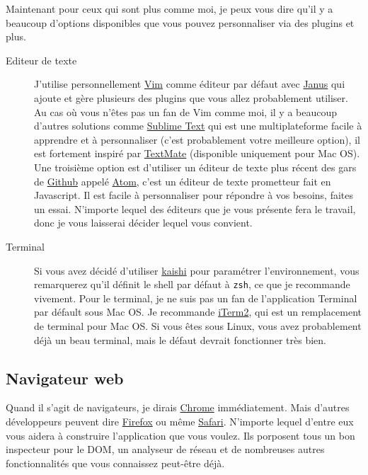 \documentclass[]{report}
\begin{document}
      Maintenant pour ceux qui sont plus comme moi, je peux vous dire qu'il y a beaucoup d'options disponibles que vous pouvez personnaliser via des plugins et plus.

      \begin{description}
        \item[Editeur de texte] J'utilise personnellement \href{http://www.vim.org/}{Vim} comme éditeur par défaut avec \href{https://github.com/carlhuda/janus}{Janus} qui ajoute et gère plusieurs des plugins que vous allez probablement utiliser. Au cas où vous n'êtes pas un fan de Vim comme moi, il y a beaucoup d'autres solutions comme \href{http://www.sublimetext.com/}{Sublime Text} qui est une multiplateforme facile à apprendre et à personnaliser (c'est probablement votre meilleure option), il est fortement inspiré par \href{http://macromates.com/}{TextMate} (disponible uniquement pour Mac OS). Une troisième option est d'utiliser un éditeur de texte plus récent des gars de \href{http://gitub.com/}{Github} appelé \href{https://atom.io/}{Atom}, c'est un éditeur de texte prometteur fait en Javascript. Il est facile à personnaliser pour répondre à vos besoins, faites un essai. N'importe lequel des éditeurs que je vous présente fera le travail, donc je vous laisserai décider lequel vous convient.

        \item[Terminal] Si vous avez décidé d'utiliser \href{http://icalialabs.github.io/kaishi/}{kaishi} pour paramétrer l'environnement, vous remarquerez qu'il définit le shell par défaut à \verb|zsh|, ce que je recommande vivement. Pour le terminal, je ne suis pas un fan de l'application Terminal par défault sous Mac OS. Je recommande \href{http://www.iterm2.com/#/section/home}{iTerm2}, qui est un remplacement de terminal pour Mac OS. Si vous êtes sous Linux, vous avez probablement déjà un beau terminal, mais le défaut devrait fonctionner très bien.
      \end{description}

    \subsection{Navigateur web}

      Quand il s'agit de navigateurs, je dirais \href{https://www.google.com/intl/en/chrome/browser/}{Chrome} immédiatement. Mais d'autres développeurs peuvent dire \href{http://www.mozilla.org/en-US/firefox/new/}{Firefox} ou même \href{https://www.apple.com/safari/}{Safari}. N'importe lequel d'entre eux vous aidera à construire l'application que vous voulez. Ils porposent tous un bon inspecteur pour le DOM, un analyseur de réseau et de nombreuses autres fonctionnalités que vous connaissez peut-être déjà.
\end{document}
